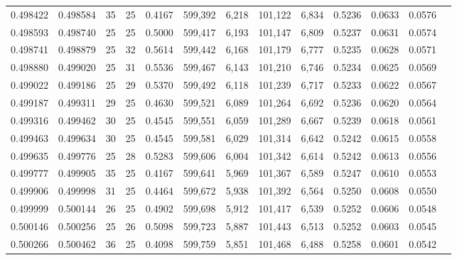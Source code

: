 \begin{tabular}{rrrrrrrrrrrrr}
0.498422 & 0.498584 &    35 &  25 &                                     0.4167 & 599,392 &   6,218 & 101,122 &   6,834 & 0.5236 & 0.0633 & 0.0576 \\
0.498593 & 0.498740 &    25 &  25 &                                     0.5000 & 599,417 &   6,193 & 101,147 &   6,809 & 0.5237 & 0.0631 & 0.0574 \\
0.498741 & 0.498879 &    25 &  32 &                                     0.5614 & 599,442 &   6,168 & 101,179 &   6,777 & 0.5235 & 0.0628 & 0.0571 \\
0.498880 & 0.499020 &    25 &  31 &                                     0.5536 & 599,467 &   6,143 & 101,210 &   6,746 & 0.5234 & 0.0625 & 0.0569 \\
0.499022 & 0.499186 &    25 &  29 &                                     0.5370 & 599,492 &   6,118 & 101,239 &   6,717 & 0.5233 & 0.0622 & 0.0567 \\
0.499187 & 0.499311 &    29 &  25 &                                     0.4630 & 599,521 &   6,089 & 101,264 &   6,692 & 0.5236 & 0.0620 & 0.0564 \\
0.499316 & 0.499462 &    30 &  25 &                                     0.4545 & 599,551 &   6,059 & 101,289 &   6,667 & 0.5239 & 0.0618 & 0.0561 \\
0.499463 & 0.499634 &    30 &  25 &                                     0.4545 & 599,581 &   6,029 & 101,314 &   6,642 & 0.5242 & 0.0615 & 0.0558 \\
0.499635 & 0.499776 &    25 &  28 &                                     0.5283 & 599,606 &   6,004 & 101,342 &   6,614 & 0.5242 & 0.0613 & 0.0556 \\
0.499777 & 0.499905 &    35 &  25 &                                     0.4167 & 599,641 &   5,969 & 101,367 &   6,589 & 0.5247 & 0.0610 & 0.0553 \\
0.499906 & 0.499998 &    31 &  25 &                                     0.4464 & 599,672 &   5,938 & 101,392 &   6,564 & 0.5250 & 0.0608 & 0.0550 \\
0.499999 & 0.500144 &    26 &  25 &                                     0.4902 & 599,698 &   5,912 & 101,417 &   6,539 & 0.5252 & 0.0606 & 0.0548 \\
0.500146 & 0.500256 &    25 &  26 &                                     0.5098 & 599,723 &   5,887 & 101,443 &   6,513 & 0.5252 & 0.0603 & 0.0545 \\
0.500266 & 0.500462 &    36 &  25 &                                     0.4098 & 599,759 &   5,851 & 101,468 &   6,488 & 0.5258 & 0.0601 & 0.0542 \\

\end{tabular}
